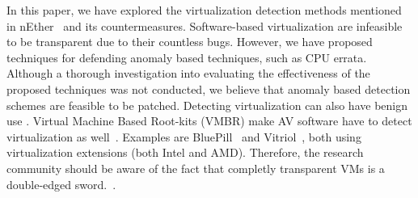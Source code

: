 In this paper, we have explored the virtualization detection methods mentioned
in nEther~\cite{nether} and its countermeasures. Software-based virtualization
are infeasible to be transparent due to their countless bugs. However, we have
proposed techniques for defending anomaly based  techniques, such as CPU errata. Although a thorough investigation
into evaluating the effectiveness of the proposed techniques was not conducted,
we believe that anomaly based detection 
schemes are feasible to be patched. Detecting virtualization can also have
benign use . Virtual Machine
Based Root-kits (VMBR) make AV software have to detect virtualization as
well~\cite{thompson, ferrie2007}. Examples are BluePill~\cite{bluepill} and
Vitriol~\cite{vitriol}, both using virtualization extensions (both Intel and
AMD). Therefore, the research community should be aware of the fact that
completly transparent VMs is a double-edged sword.~.

